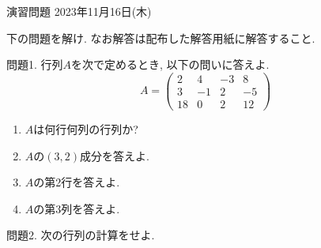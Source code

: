 \documentclass[dvipdfmx,a4paper,11pt]{article}
\theoremstyle{definition}
\begin{document}
\pagestyle{empty}



\begin{center}
{\Large 演習問題 2023年11月16日(木)} \\

\end{center}


\begin{center}
 {\large 下の問題を解け. なお解答は配布した解答用紙に解答すること. }
  \end{center}
  
 問題1.  行列$A$を次で定めるとき, 以下の問いに答えよ.
 $$
 A = 
 \begin{pmatrix}
 2 &4&-3&8 \\
 3&-1&2&-5 \\
  18&0&2&12
 \end{pmatrix}
 $$
 \begin{enumerate}
   \setlength{\parskip}{0cm} %
  \setlength{\itemsep}{0cm} %
 \item $A$は何行何列の行列か?
 \item $A$の$(3,2)$成分を答えよ.
  \item $A$の第2行を答えよ.
 \item $A$の第3列を答えよ.
 \end{enumerate}
 
\vspace{5pt}
 問題2. 次の行列の計算をせよ.
\end{document}
